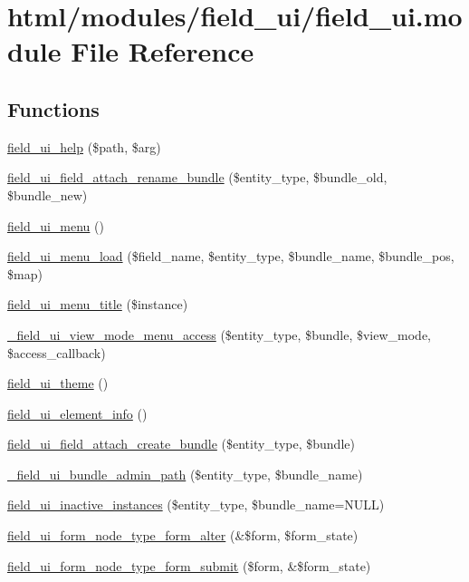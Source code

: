 \hypertarget{field__ui_8module}{
\section{html/modules/field\_\-ui/field\_\-ui.module File Reference}
\label{field__ui_8module}
}
\subsection*{Functions}
\begin{DoxyCompactItemize}
\item 
\hyperlink{field__ui_8module_a865661161ea523e51a55958d45bb9e9e}{field\_\-ui\_\-help} (\$path, \$arg)
\item 
\hyperlink{field__ui_8module_a2014163f1e6ea6b59d17cefe5534d596}{field\_\-ui\_\-field\_\-attach\_\-rename\_\-bundle} (\$entity\_\-type, \$bundle\_\-old, \$bundle\_\-new)
\item 
\hyperlink{field__ui_8module_a84565b21a33e9348e00755696dd26655}{field\_\-ui\_\-menu} ()
\item 
\hyperlink{group__field_gac2e5ac493328c146f17164168de40492}{field\_\-ui\_\-menu\_\-load} (\$field\_\-name, \$entity\_\-type, \$bundle\_\-name, \$bundle\_\-pos, \$map)
\item 
\hyperlink{field__ui_8module_a6947266bcb38640f56ae1add799f40d6}{field\_\-ui\_\-menu\_\-title} (\$instance)
\item 
\hyperlink{field__ui_8module_a6b12ecad88197fdae1bcf83e3c0f9354}{\_\-field\_\-ui\_\-view\_\-mode\_\-menu\_\-access} (\$entity\_\-type, \$bundle, \$view\_\-mode, \$access\_\-callback)
\item 
\hyperlink{field__ui_8module_aa9023fa02dc12113527fb0263d4abcc2}{field\_\-ui\_\-theme} ()
\item 
\hyperlink{field__ui_8module_ab692b5bd1afde931919087fa5b172da5}{field\_\-ui\_\-element\_\-info} ()
\item 
\hyperlink{field__ui_8module_addc5ea31872203f8a9419766d55d484a}{field\_\-ui\_\-field\_\-attach\_\-create\_\-bundle} (\$entity\_\-type, \$bundle)
\item 
\hyperlink{field__ui_8module_a64548860d564d7e793789482379fa29f}{\_\-field\_\-ui\_\-bundle\_\-admin\_\-path} (\$entity\_\-type, \$bundle\_\-name)
\item 
\hyperlink{field__ui_8module_a49d3221007d0ca39e179a931079716f1}{field\_\-ui\_\-inactive\_\-instances} (\$entity\_\-type, \$bundle\_\-name=NULL)
\item 
\hyperlink{field__ui_8module_ab23871fe4a263c0c11da6f5910525545}{field\_\-ui\_\-form\_\-node\_\-type\_\-form\_\-alter} (\&\$form, \$form\_\-state)
\item 
\hyperlink{field__ui_8module_a2a1b80b334d159a9222056d932317ec7}{field\_\-ui\_\-form\_\-node\_\-type\_\-form\_\-submit} (\$form, \&\$form\_\-state)
\end{DoxyCompactItemize}


